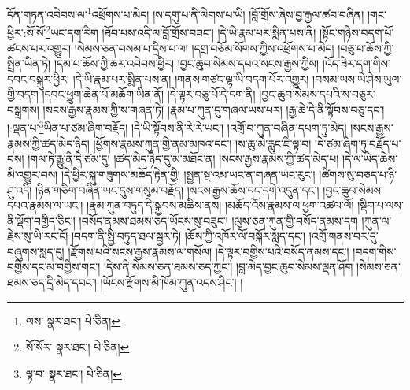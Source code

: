 དོན་གཏན་འབེབས་ལ་\footnote{ལས་  སྣར་ཐང་།  པེ་ཅིན། }འཕྲོགས་པ་མེད། །ས་དགུ་པ་ནི་ལེགས་པ་ཡི། །བློ་གྲོས་ཞེས་བྱ་རྒྱལ་ཚབ་བཞིན། །གང་ཕྱིར་:སོ་སོ་\footnote{སོ་སོར་  སྣར་ཐང་།  པེ་ཅིན། }ཡང་དག་རིག །ཐོབ་པས་འདི་ལ་བློ་གྲོས་བཟང་། །དེ་ཡི་རྣམ་པར་སྨིན་པས་ནི། །སྟོང་གཉིས་བདག་པོ་ཚངས་པར་འགྱུར། །སེམས་ཅན་བསམ་པ་དྲིས་པ་ལ། །དགྲ་བཅོམ་སོགས་ཀྱིས་འཕྲོགས་པ་མེད། །བཅུ་པ་ཆོས་ཀྱི་སྤྲིན་ཡིན་ཏེ། །དམ་པ་ཆོས་ཀྱི་ཆར་འབེབས་ཕྱིར། །བྱང་ཆུབ་སེམས་དཔའ་སངས་རྒྱས་ཀྱིས། །འོད་ཟེར་དག་གིས་དབང་བསྐུར་ཕྱིར། །དེ་ཡི་རྣམ་པར་སྨིན་པས་ན། །གནས་གཙང་ལྷ་ཡི་བདག་པོར་འགྱུར། །བསམ་ཡས་ཡེ་ཤེས་ཡུལ་གྱི་བདག །དབང་ཕྱུག་ཆེན་པོ་མཆོག་ཡིན་ནོ། །དེ་ལྟར་བཅུ་པོ་དེ་དག་ནི། །བྱང་ཆུབ་སེམས་དཔའི་ས་བཅུར་བསྒྲགས། །སངས་རྒྱས་རྣམས་ཀྱི་ས་གཞན་ཏེ། །རྣམ་པ་ཀུན་དུ་གཞལ་ཡས་པར། །རྒྱ་ཆེ་དེ་ནི་སྟོབས་བཅུ་དང་། །:ལྡན་པ་\footnote{ལྟ་བ་  སྣར་ཐང་།  པེ་ཅིན། }ཡིན་པ་ཙམ་ཞིག་བརྗོད། །དེ་ཡི་སྟོབས་ནི་རེ་རེ་ཡང་། །འགྲོ་བ་ཀུན་བཞིན་དཔག་ཏུ་མེད། །སངས་རྒྱས་རྣམས་ཀྱི་ཚད་མེད་ཉིད། །ཕྱོགས་རྣམས་ཀུན་གྱི་ནམ་མཁའ་དང་། །ས་ཆུ་མེ་རླུང་ཇི་ལྟ་བ། །དེ་ཙམ་ཞིག་ཏུ་བརྗོད་པ་བས། །གལ་ཏེ་རྒྱུ་ནི་དེ་ཙམ་དུ། །ཚད་མེད་ཉིད་དུ་མ་མཐོང་ན། །སངས་རྒྱས་རྣམས་ཀྱི་ཚད་མེད་པ། །དེ་ལ་ཡིད་ཆེས་མི་འགྱུར་བས། །དེ་ཕྱིར་སྐུ་གཟུགས་མཆོད་རྟེན་གྱི། །སྤྱན་སྔ་འམ་ཡང་ན་གཞན་ཡང་རུང་། །ཚིགས་སུ་བཅད་པ་ཉི་ཤུ་འདི། །ཉིན་གཅིག་བཞིན་ཡང་དུས་གསུམ་བརྗོད། །སངས་རྒྱས་ཆོས་དང་དགེ་འདུན་དང་། །བྱང་ཆུབ་སེམས་དཔའ་རྣམས་ལ་ཡང་། །རྣམ་ཀུན་བཏུད་དེ་སྐྱབས་མཆིས་ནས། །མཆོད་འོས་རྣམས་ལ་ཕྱག་འཚལ་ལོ། །སྡིག་པ་ལས་ནི་ལྡོག་བགྱིད་ཅིང་། །བསོད་ནམས་ཐམས་ཅད་ཡོངས་སུ་བཟུང་། །ལུས་ཅན་ཀུན་གྱི་བསོད་ནམས་དག །ཀུན་ལ་རྗེས་སུ་ཡི་རང་ངོ། །བདག་ནི་སྤྱི་བཏུད་ཐལ་སྦྱར་ཏེ། །ཆོས་ཀྱི་འཁོར་ལོ་བསྐོར་སླད་དང་། །འགྲོ་གནས་བར་དུ་བཞུགས་སླད་དུ། །རྫོགས་པའི་སངས་རྒྱས་རྣམས་ལ་གསོལ། །དེ་ལྟར་བགྱིས་པའི་བསོད་ནམས་དང་། །བདག་གིས་བགྱིས་དང་མ་བགྱིས་གང་། །དེས་ནི་སེམས་ཅན་ཐམས་ཅད་ཀྱང་། །བླ་མེད་བྱང་ཆུབ་སེམས་ལྡན་ཤོག །སེམས་ཅན་ཐམས་ཅད་དྲི་མེད་དབང་། །ཡོངས་རྫོགས་མི་ཁོམ་ཀུན་འདས་ཤིང་། །
